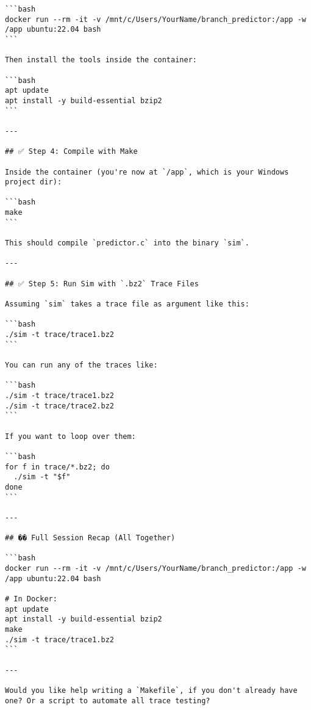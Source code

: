 \documentclass[11pt]{article}
\begin{document}
\begin{Verbatim}[fontsize=\tiny, breaklines=true]
```bash
docker run --rm -it -v /mnt/c/Users/YourName/branch_predictor:/app -w /app ubuntu:22.04 bash
```

Then install the tools inside the container:

```bash
apt update
apt install -y build-essential bzip2
```

---

## ✅ Step 4: Compile with Make

Inside the container (you're now at `/app`, which is your Windows project dir):

```bash
make
```

This should compile `predictor.c` into the binary `sim`.

---

## ✅ Step 5: Run Sim with `.bz2` Trace Files

Assuming `sim` takes a trace file as argument like this:

```bash
./sim -t trace/trace1.bz2
```

You can run any of the traces like:

```bash
./sim -t trace/trace1.bz2
./sim -t trace/trace2.bz2
```

If you want to loop over them:

```bash
for f in trace/*.bz2; do
  ./sim -t "$f"
done
```

---

## �� Full Session Recap (All Together)

```bash
docker run --rm -it -v /mnt/c/Users/YourName/branch_predictor:/app -w /app ubuntu:22.04 bash

# In Docker:
apt update
apt install -y build-essential bzip2
make
./sim -t trace/trace1.bz2
```

---

Would you like help writing a `Makefile`, if you don't already have one? Or a script to automate all trace testing?
\end{Verbatim}
\end{document}
